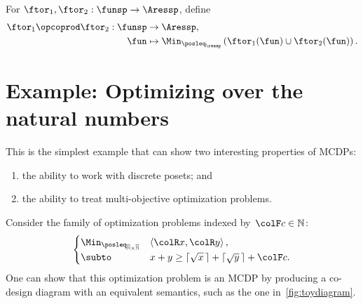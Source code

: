 \begin{definition}
\label{def:opcoprod}For $\ftor_{1},\ftor_{2}:\funsp\rightarrow\Aressp$,
define
\begin{align*}
\ftor_{1}\opcoprod\ftor_{2}:\funsp & \rightarrow\Aressp,\\
\fun& \mapsto\Min_{\posleq_{\ressp}}\left(\ftor_{1}(\fun)\cup\ftor_{2}(\fun)\right).
\end{align*}
\end{definition}


\section{Example: Optimizing over the natural numbers}

This is the simplest example that can show two interesting properties
of MCDPs:
\begin{enumerate}
\item the ability to work with discrete posets; and
\item the ability to treat multi-objective optimization problems.
\end{enumerate}
Consider the family of optimization problems indexed by~${\colF c}\in\mathbb{N}$:
\begin{equation}
\begin{cases}
\Min_{\posleq_{\overline{\mathbb{N}}\times\overline{\mathbb{N}}}} & \left\langle {\colR x},{\colR y}\right\rangle ,\\
\subto & x+y\geq\lceil\sqrt{x}\,\rceil+\lceil\sqrt{y}\,\rceil+{\colF c}.
\end{cases}\label{eq:example-1}
\end{equation}
One can show that this optimization problem is an MCDP by producing
a co-design diagram with an equivalent semantics, such as the one
in~\cref{fig:toydiagram}.

